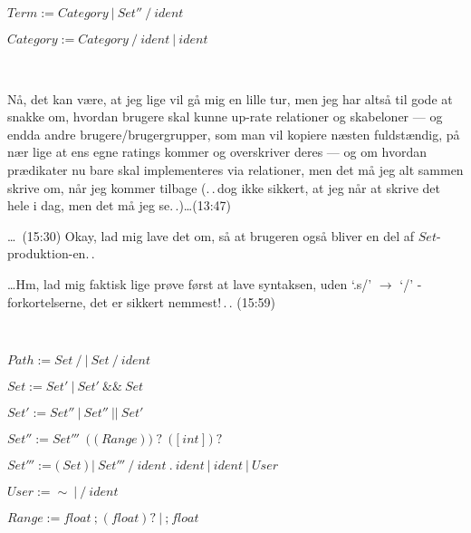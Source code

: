 \documentclass{report}
\begin{document}
$Term := Category\ |\ Set''\ \texttt{/}\ ident$

$Category := Category\ \texttt{/}\ ident\ |\ ident$

\ 

Nå, det kan være, at jeg lige vil gå mig en lille tur, men jeg har altså til gode at snakke om, hvordan brugere skal kunne up-rate relationer og skabeloner --- og endda andre brugere/brugergrupper, som man vil kopiere næsten fuldstændig, på nær lige at ens egne ratings kommer og overskriver deres --- og om hvordan prædikater nu bare skal implementeres via relationer, men det må jeg alt sammen skrive om, når jeg kommer tilbage (.\,.\,dog ikke sikkert, at jeg når at skrive det hele i dag, men det må jeg se.\,.)\ldots (13:47)

\ldots\ (15:30) Okay, lad mig lave det om, så at brugeren også bliver en del af $Set$-produktion-en.\,.

\ldots Hm, lad mig faktisk lige prøve først at lave syntaksen, uden `.s/' $\to$ `/' -forkortelserne, det er sikkert nemmest!\,.\,. (15:59)

\ 

$Path :=  Set\ \texttt{/}\ |\ Set\ \texttt{/}\ ident$



$Set := Set'\ |\ Set'\ \texttt{\&\&}\ Set$ 

$Set' := Set''\ |\ Set''\ \texttt{||}\ Set'$ 

$Set'' := Set'''\ (\texttt{(}\ Range\ \texttt{)})?\ (\texttt{[}\ int\ \texttt{]})? $ 


$Set''' := \texttt{(}\ Set\ \texttt{)}\ |\ 
	Set'''\ \texttt{/}\ ident\ \texttt{.}\ ident\ |\ 
	ident\ |\ 
	User
$ 


$User := \mathtt{\sim}\ |\ \texttt{/}\ ident$ 

$Range := float\ \texttt{;}\ (float)?\ |\ \texttt{;}\ float$

\ 
\end{document}
